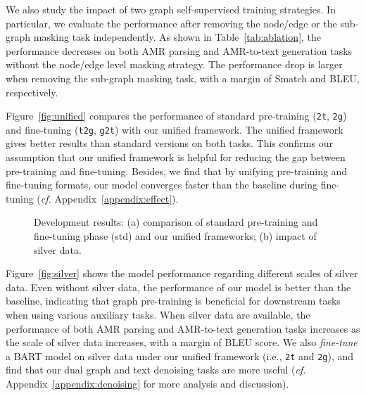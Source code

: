 \documentclass[11pt]{article}
\begin{document}
We also study the impact of two graph self-supervised training strategies.
In particular, we evaluate the performance after removing the node/edge or the sub-graph masking task independently. 
As shown in Table~\ref{tab:ablation}, 
the performance decreases on both AMR parsing and AMR-to-text generation tasks without the node/edge level masking strategy.
The performance drop is larger when removing the sub-graph masking task, with a margin of  Smatch and  BLEU, respectively.



Figure~\ref{fig:unified} compares the performance of standard pre-training (\texttt{\texttt{2t}}, \texttt{2g}) and fine-tuning (\texttt{t2g}, \texttt{g2t}) with our unified framework. 
The unified framework gives better results than standard versions on both tasks. 
This confirms our assumption that our unified framework is helpful for reducing the gap between pre-training and fine-tuning.
Besides, we find that by unifying pre-training and fine-tuning formats, our model converges faster than the baseline during fine-tuning (\emph{cf.} Appendix~\ref{appendix:effect}).


\begin{figure}[!t]
\setlength{\belowcaptionskip}{-0.1cm}
	\centering 
	 \hspace{0.10in}
	\caption{Development results: (a) comparison of standard pre-training and fine-tuning phase (std) and our unified frameworks; (b) impact of silver data.}
	\label{fig:dev}
\end{figure}

Figure~\ref{fig:silver} shows the model performance regarding different scales of silver data. 
Even without silver data, the performance of our model is better than the baseline, indicating that graph pre-training is beneficial for downstream tasks when using various auxiliary tasks.
When silver data are available, the performance of both AMR parsing and AMR-to-text generation tasks increases as the scale of silver data increases, with a margin of  BLEU score.
We also \emph{fine-tune} a BART model on silver data under our unified framework (i.e., \texttt{2t} and \texttt{2g}), and find that our dual graph and text denoising tasks are more useful (\textit{cf.} Appendix~\ref{appendix:denoising} for more analysis and discussion).
\end{document}
